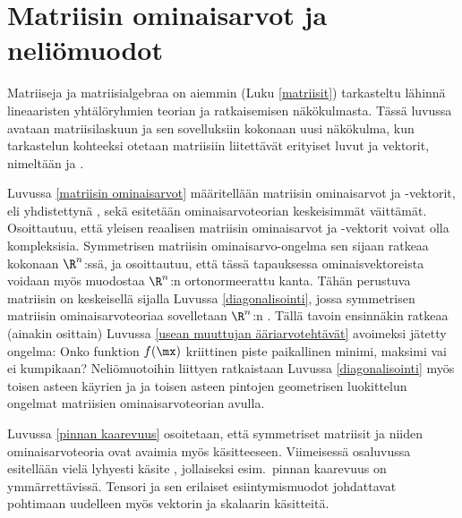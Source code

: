 \chapter{Matriisin ominaisarvot ja neliömuodot}

Matriiseja ja matriisialgebraa on aiemmin (Luku \ref{matriisit}) tarkasteltu lähinnä
lineaaristen yhtälöryhmien teorian ja ratkaisemisen näkökulmasta. Tässä luvussa avataan
matriisilaskuun ja sen sovelluksiin kokonaan uusi näkökulma, kun tarkastelun kohteeksi otetaan
matriisiin liitettävät erityiset luvut ja vektorit, nimeltään  ja
.

Luvussa \ref{matriisin ominaisarvot} määritellään matriisin ominaisarvot ja -vektorit, eli
yhdistettynä , sekä esitetään ominaisarvoteorian keskeisimmät väittämät.
Osoittautuu, että yleisen reaalisen matriisin ominaisarvot ja -vektorit voivat olla
komp\-leksisia. Symmetrisen matriisin ominaisarvo-ongelma sen sijaan ratkeaa kokonaan
$\R^n$:ssä, ja osoittautuu, että tässä tapauksessa ominaisvektoreista voidaan myös muodostaa
$\R^n$:n ortonormeerattu kanta. Tähän perustuva matriisin  on keskeisellä
sijalla Luvussa \ref{diagonalisointi}, jossa symmetrisen matriisin ominais\-arvoteoriaa
sovelletaan $\R^n$:n . Tällä tavoin ensinnäkin ratkeaa (ainakin osittain)
Luvussa \ref{usean muuttujan ääriarvotehtävät} avoimeksi jätetty ongelma: Onko funktion
$f(\mx)$ kriittinen piste paikallinen minimi, maksimi vai ei kumpikaan? Neliömuotoihin liittyen
ratkaistaan Luvussa \ref{diagonalisointi} myös toisen asteen käyrien ja ja toisen asteen
pintojen geometrisen luokittelun ongelmat matriisien ominaisarvoteorian avulla.    

Luvussa \ref{pinnan kaarevuus} osoitetaan, että symmetriset matriisit ja niiden
ominaisarvoteoria ovat avaimia myös  käsitteeseen. Viimeisessä
osaluvussa esitellään vielä lyhyesti käsite , jollaiseksi esim.\ pinnan kaarevuus
on ymmärrettävissä. Tensori ja sen erilaiset esiintymismuodot johdattavat pohtimaan uudelleen
myös vektorin ja skalaarin käsitteitä.
